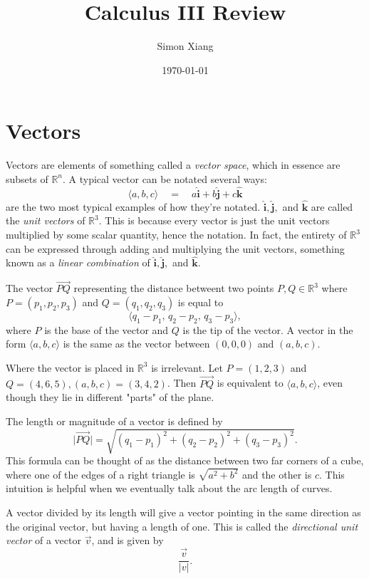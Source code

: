 \documentclass{article}
\title{Calculus III Review}
\author{Simon Xiang}
\date{\today}
\theoremstyle{definition}
\begin{document}
\maketitle

\section{Vectors}
Vectors are elements of something called a \textit{vector space}, which in essence are subsets of $\mathbb{R}^n$.
A typical vector can be notated several ways:
\begin{equation}
    \langle a,b,c \rangle \quad = \quad a\boldsymbol{\hat{i}} + b\boldsymbol{\hat{j}} + c\boldsymbol{\hat{k}}
\end{equation}
are the two most typical examples of how they're notated. $\boldsymbol{\hat{i}},\boldsymbol{\hat{j}},$ and $\boldsymbol{\hat{k}}$
are called the \textit{unit vectors} of $\mathbb{R}^3$. This is because every vector is just the unit vectors multiplied
by some scalar quantity, hence the notation. In fact, the entirety of $\mathbb{R}^3$ can be expressed through adding and
multiplying the unit vectors, something known as a \textit{linear combination} of $\boldsymbol{\hat{i}},\boldsymbol{\hat{j}},$ and $\boldsymbol{\hat{k}}$.

The vector $\vec{PQ}$ representing the distance betweent two points $P, Q \in \mathbb{R}^3$ where $P = (p_1,p_2,p_3)$ and $Q = 
(q_1,q_2,q_3)$ is equal to 
\begin{equation}
    \langle q_1-p_1, \, q_2-p_2, \, q_3-p_3 \rangle , 
\end{equation}
 where $P$ is the base of the vector and $Q$ is the tip of the vector. A vector in the form $\langle a,b,c \rangle$ is the same
 as the vector between $(0,0,0)$ and $(a,b,c)$. 

 Where the vector is placed in $\mathbb{R}^3$ is irrelevant. Let $P=(1,2,3)$ and $Q=(4,6,5), (a,b,c)=(3,4,2)$. Then 
 $\vec{PQ}$ is equivalent to $\langle a,b,c \rangle$, even though they lie in different "parts" of the plane.

 The length or magnitude of a vector is defined by 
\begin{equation}
  \lvert \vec{PQ} \rvert = \sqrt{(q_1-p_1)^2 + (q_2-p_2)^2 + (q_3-p_3)^2}.    
\end{equation}
This formula can be thought of as the distance between two far corners of a cube, where one of the edges of a right 
triangle is $\sqrt{a^2+b^2}$ and the other is $c$. This intuition is helpful when we eventually 
talk about the arc length of curves. 

A vector divided by its length will give a vector pointing in the same direction as the original vector, but having 
a length of one. This is called the \textit{directional unit vector} of a vector $\vec{v}$, and is given by 
\begin{equation}
    \frac{\vec{v}}{\lvert v \rvert}.
\end{equation}
\end{document}

